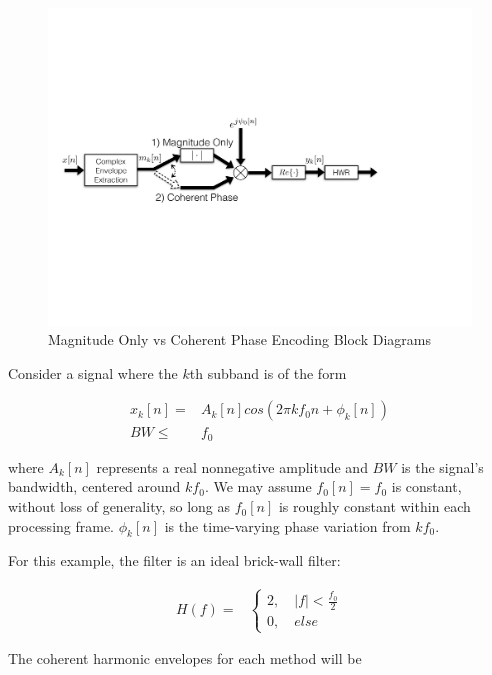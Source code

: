 \documentclass [11pt, proquest,oneside] {ganter_thesis}[2015/03/03]
\begin{document}
\begin{figure}[!ht]
  \centering
    \includegraphics[width=1\textwidth]{coherent_phase}   
    \caption{Magnitude Only vs Coherent Phase Encoding Block Diagrams}
    \label{fig:coherent_angle}
\end{figure}

Consider a signal where the $k$th subband is of the form

\begin{align}
x_k[n] =& A_k[n]cos(2\pi kf_0n + \phi_k[n]) \\
BW \leq& f_0 \nonumber
\end{align}

where $A_k[n]$ represents a real nonnegative amplitude and $BW$ is the signal's bandwidth, centered around $kf_0$.  We may assume $f_0[n] = f_0$ is constant, without loss of generality, so long as $f_0[n]$ is roughly constant within each processing frame.  $\phi_k[n]$ is the time-varying phase variation from $kf_0$.

For this example, the filter is an ideal brick-wall filter:

\begin{align}
H(f) =& \left\{
                \begin{array}{ll}
                2, \quad |f| < \frac{f_0}{2} \\
			   0, \quad else \nonumber
                \end{array}
              \right.
\end{align}

The coherent harmonic envelopes for each method will be
\end{document}
